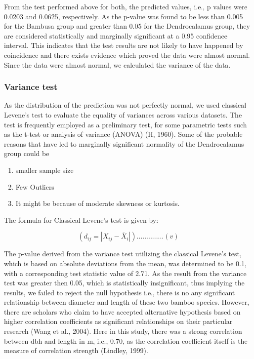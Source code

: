 \documentclass[preprint, 3p,
authoryear]{elsarticle} %
\begin{document}
From the test performed above for both, the predicted values, i.e., p
values were 0.0203 and 0.0625, respectively. As the p-value was found to
be less than 0.005 for the Bambusa group and greater than 0.05 for the
Dendrocalamus group, they are considered statistically and marginally
significant at a 0.95 confidence interval. This indicates that the test
results are not likely to have happened by coincidence and there exists
evidence which proved the data were almost normal. Since the data were
almost normal, we calculated the variance of the data.

\hypertarget{variance-test}{%
\subsubsection{Variance test}\label{variance-test}}

As the distribution of the prediction was not perfectly normal, we used
classical Levene's test to evaluate the equality of variances across
various datasets. The test is frequently employed as a preliminary test,
for some parametric tests such as the t-test or analysis of variance
(ANOVA) (H, 1960). Some of the probable reasons that have led to
marginally significant normality of the Dendrocalamus group could be

\begin{enumerate}
\def\labelenumi{\alph{enumi}.}
\item
  smaller sample size
\item
  Few Outliers
\item
  It might be because of moderate skewness or kurtosis.
\end{enumerate}

The formula for Classical Levene's test is given by:

\[( d_{ij} = |X_{ij} - \bar{X}_i| ) ..............(v)\]

The p-value derived from the variance test utilizing the classical
Levene's test, which is based on absolute deviations from the mean, was
determined to be 0.1, with a corresponding test statistic value of 2.71.
As the result from the variance test was greater then 0.05, which is
statistically insignificant, thus implying the results, we failed to
reject the null hypothesis i.e., there is no any significant
relationship between diameter and length of these two bamboo species.
However, there are scholars who claim to have accepted alternative
hypothesis based on higher correlation coefficients as significant
relationships on their particular research (Wang et al., 2004). Here in
this study, there was a strong correlation between dbh and length in m,
i.e., 0.70, as the correlation coefficient itself is the measure of
correlation strength (Lindley, 1999).
\end{document}
